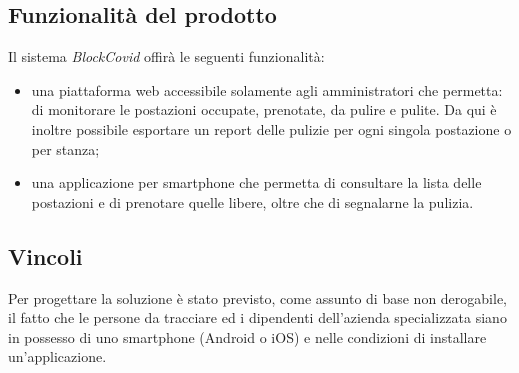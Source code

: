 \subsection{Funzionalit\`{a} del prodotto}
Il sistema \emph{BlockCovid} offir\`{a} le seguenti funzionalit\`{a}:
\begin{itemize}
    \item una piattaforma web accessibile solamente agli amministratori che permetta: di monitorare le postazioni occupate, prenotate, da pulire e pulite. Da qui \`{e} inoltre possibile esportare un report delle pulizie per ogni singola postazione o per stanza;
    \item una applicazione per smartphone che permetta di consultare la lista delle postazioni e di prenotare quelle libere, oltre che di segnalarne la pulizia.
\end{itemize}

\subsection{Vincoli}
Per progettare la soluzione è stato previsto, come assunto di base non derogabile, il fatto che le persone
da tracciare ed i dipendenti dell’azienda specializzata siano in possesso di uno smartphone (Android o iOS) e nelle condizioni di installare un’applicazione.
